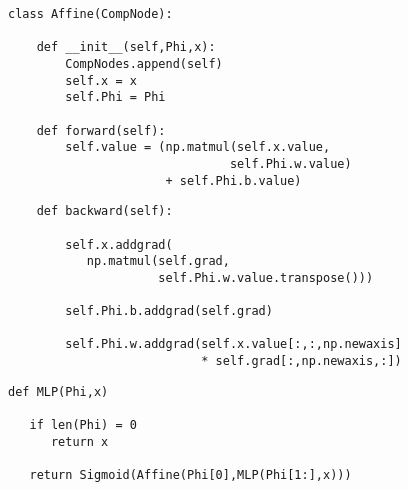 {\vfill
\eject
\begin{verbatim}
class Affine(CompNode):

    def __init__(self,Phi,x):
        CompNodes.append(self)
        self.x = x
        self.Phi = Phi

    def forward(self):
        self.value = (np.matmul(self.x.value,
                               self.Phi.w.value)
                      + self.Phi.b.value)
\end{verbatim}
\vfill
\eject
\vfill
\begin{verbatim}
    def backward(self):

        self.x.addgrad(
           np.matmul(self.grad,
                     self.Phi.w.value.transpose()))

        self.Phi.b.addgrad(self.grad)

        self.Phi.w.addgrad(self.x.value[:,:,np.newaxis]
                           * self.grad[:,np.newaxis,:])
\end{verbatim}



\begin{verbatim}
def MLP(Phi,x)

   if len(Phi) = 0
      return x

   return Sigmoid(Affine(Phi[0],MLP(Phi[1:],x)))
\end{verbatim}

}
